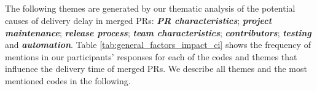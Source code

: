 	
	
	
	

\subsection*{\textbf{\RQfour}}

The following themes are generated by our thematic analysis of the potential causes of delivery delay in merged PRs: \textit{\textbf{PR characteristics}}; \textit{\textbf{project maintenance}}; \textit{\textbf{release process}}; \textit{\textbf{team characteristics}}; \textit{\textbf{contributors}}; \textit{\textbf{testing}} and \textit{\textbf{automation}}. Table \ref{tab:general_factors_impact_ci} shows the frequency of mentions in our participants' responses for each of the codes and themes that influence the delivery time of merged PRs. We describe all themes and the most mentioned codes in the following.

